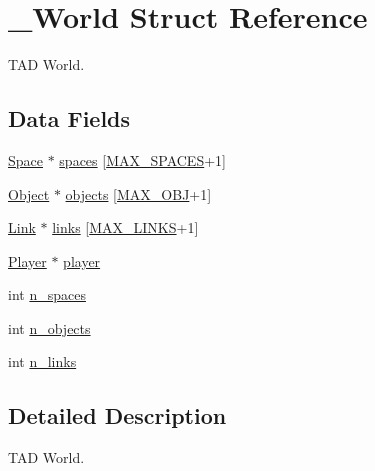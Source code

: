 \hypertarget{struct___world}{\section{\+\_\+\+World Struct Reference}
\label{struct___world}
}


T\+A\+D World.  


\subsection*{Data Fields}
\begin{DoxyCompactItemize}
\item 
\hyperlink{_space_8h_a67533ffc2b70463baecc38fb0629bbfc}{Space} $\ast$ \hyperlink{struct___world_accfe91baa7a309d2673669de3a32d1dd}{spaces} \mbox{[}\hyperlink{_types_8h_a5f54fd55f983a2e33ce076cd9f587e82}{M\+A\+X\+\_\+\+S\+P\+A\+C\+E\+S}+1\mbox{]}
\item 
\hyperlink{_object_8h_a7f8bbcda919b65ce67f92fba08e0212f}{Object} $\ast$ \hyperlink{struct___world_adaa4163a8ff9384706bfc9069d9740cc}{objects} \mbox{[}\hyperlink{_types_8h_a8e497c59a3362df6102c893a8498acd0}{M\+A\+X\+\_\+\+O\+B\+J}+1\mbox{]}
\item 
\hyperlink{_link_8h_ae3b299941e67be6971bfd64a25505eff}{Link} $\ast$ \hyperlink{struct___world_a3d45b9d0094a167b8e4936ff04f71ef7}{links} \mbox{[}\hyperlink{_types_8h_a660ed1ec8604982002a0d6eced0e0367}{M\+A\+X\+\_\+\+L\+I\+N\+K\+S}+1\mbox{]}
\item 
\hyperlink{_player_8h_af30e2030635a69690f85e48bc6ef202f}{Player} $\ast$ \hyperlink{struct___world_a96781128d3743da3d17e0fdd91afba7b}{player}
\item 
int \hyperlink{struct___world_a115193c4bd03f769bf9ded0c71211fef}{n\+\_\+spaces}
\item 
int \hyperlink{struct___world_a4b20d9bbde54f55c1111fa181a1f4725}{n\+\_\+objects}
\item 
int \hyperlink{struct___world_aba9d8c2e77427b72c44374efb036a12f}{n\+\_\+links}
\end{DoxyCompactItemize}


\subsection{Detailed Description}
T\+A\+D World. 


\begin{DoxyItemize}
\item 
\end{DoxyItemize}

